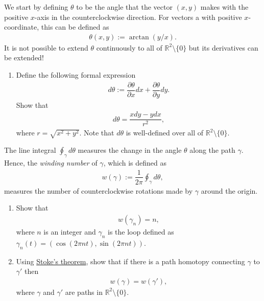 \documentclass{article}
\begin{document}
\begin{enumerate}
    We start by defining $\theta$ to be the angle that the vector $(x,y)$ makes with the positive $x$-axis in the counterclockwise direction.
    For vectors a with positive $x$-coordinate, this can be defined as
    \begin{align*}
        \theta(x,y) := \arctan(y/x).
    \end{align*}
    It is not possible to extend $\theta$ continuously to all of $\mathbb{R}^2 \setminus \{ 0 \}$ but its derivatives can be extended!
    \begin{enumerate}
        \item 
        Define the following formal expression
        \begin{align*}
            d \theta := \dfrac{\partial \theta}{\partial x} dx + \dfrac{\partial \theta}{\partial y} dy.
        \end{align*}
        Show that 
        \begin{align*}
            d \theta = \dfrac{x dy - y dx}{r^2},
        \end{align*}
        where $r = \sqrt{x^2 + y^2}$. 
        Note that $d \theta$ is well-defined over all of $\mathbb{R}^2 \setminus \{0\}$.
    \end{enumerate}
    The line integral
    $\oint _{\gamma} d \theta$
    measures the change in the angle $\theta$ along the path $\gamma$. Hence, the \emph{winding number} of $\gamma$, which is defined as
    \begin{align*}
        w(\gamma) := \dfrac{1}{2 \pi} \oint _{\gamma} d \theta,
    \end{align*}
    measures the number of counterclockwise rotations made by $\gamma$ around the origin.
    \begin{enumerate}[resume]
        \item Show that
        \begin{align*}
            w(\gamma_n) = n,
        \end{align*}
        where $n$ is an integer and $\gamma_n$ is the loop defined as $\gamma_n(t) = (\cos (2 \pi n t), \sin (2 \pi n t))$.
        \item Using \href{https://en.wikipedia.org/wiki/Kelvin-Stokes_theorem}{Stoke's theorem}, show that if there is a path homotopy connecting $\gamma$ to $\gamma'$ then 
        \begin{align*}
            w(\gamma) = w(\gamma'),
        \end{align*}
        where $\gamma$ and $\gamma'$ are paths in $\mathbb{R}^2 \setminus \{ 0 \}$.

\end{enumerate}
\end{enumerate}
\end{document}

